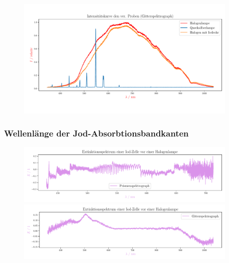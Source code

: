 \documentclass[12pt,english,ngerman]{scrartcl}
\begin{document}
\begin{figure}[H]
	\begin{center}
		\includegraphics[width=0.95\textwidth]{figures/intensity_spektrum_gitter.pdf}
	\end{center}
	\caption{}\label{fig:spektraGitter}
\end{figure}

\subsubsection{Wellenlänge der Jod-Absorbtionsbandkanten}

\begin{figure}[H]
	\begin{center}
		\includegraphics[width=0.95\textwidth]{figures/prism_extinction.pdf}
		\includegraphics[width=0.95\textwidth]{figures/gitter_extinction.pdf}
	\end{center}
	\caption{}\label{fig:extinktionkurven}
\end{figure}
\end{document}
